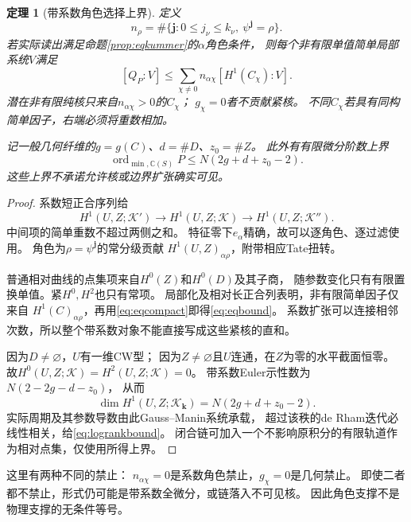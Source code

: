 \documentclass[11pt,a4paper]{ctexart}
\theoremstyle{cnplain}\newtheorem{theorem}{定理}[section]
\theoremstyle{definition}\newtheorem{definition}[theorem]{定义}
\theoremstyle{remark}\newtheorem{remark}[theorem]{注}
\begin{document}
\begin{theorem}[带系数角色选择上界]\label{thm:eqselection}
定义
\begin{equation}\label{eq:nchar}
 n_\rho=\#\{\mathbf j:0\le j_\nu\le k_\nu,\ \psi^{\mathbf j}=\rho\}.
\end{equation}
若实际读出满足命题\ref{prop:eqkummer}的$\alpha$角色条件，
则每个非有限单值简单局部系统$V$满足
\begin{equation}\label{eq:eqbound}
 [Q_P:V]\le\sum_{\chi\ne0}
                  n_{\alpha\chi}[H^1(C_\chi):V].
\end{equation}
潜在非有限纯核只来自$n_{\alpha\chi}>0$的$C_\chi$；
$g_\chi=0$者不贡献紧核。
不同$C_\chi$若具有同构简单因子，右端必须将重数相加。

记一般几何纤维的$g=g(C)$、$d=\#D$、$z_0=\#Z$。
此外有有限微分阶数上界
\begin{equation}\label{eq:logrankbound}
 \operatorname{ord}_{\min,\mathbb C(S)}P
             \le N(2g+d+z_0-2).
\end{equation}
这些上界不承诺允许核或边界扩张确实可见。
\end{theorem}
\begin{proof}
系数短正合序列给
\[
 H^1(U,Z;\mathcal K')\longrightarrow
 H^1(U,Z;\mathcal K)\longrightarrow H^1(U,Z;\mathcal K'').
\]
中间项的简单重数不超过两侧之和。
特征零下$e_\alpha$精确，故可以逐角色、逐过滤使用。
角色为$\rho=\psi^{\mathbf j}$的常分级贡献
$H^1(U,Z)_{\alpha\rho}$，附带相应Tate扭转。

普通相对曲线的点集项来自$H^0(Z)$和$H^0(D)$及其子商，
随参数变化只有有限置换单值。紧$H^0,H^2$也只有常项。
局部化及相对长正合列表明，非有限简单因子仅来自
$H^1(C)_{\alpha\rho}$，再用\eqref{eq:eqcompact}即得\eqref{eq:eqbound}。
系数扩张可以连接相邻次数，所以整个带系数对象不能直接写成这些紧核的直和。

因为$D\ne\varnothing$，$U$有一维CW型；
因为$Z\ne\varnothing$且$U$连通，在$Z$为零的水平截面恒零。
故$H^0(U,Z;\mathcal K)=H^2(U,Z;\mathcal K)=0$。
带系数Euler示性数为$N(2-2g-d-z_0)$，
从而
\[
 \dim H^1(U,Z;\mathcal K_{\mathbf k})=N(2g+d+z_0-2).
\]
实际周期及其参数导数由此Gauss--Manin系统承载，
超过该秩的de Rham迭代必线性相关，给\eqref{eq:logrankbound}。
闭合链可加入一个不影响原积分的有限轨道作为相对点集，仅使用所得上界。
\end{proof}

这里有两种不同的禁止：
$n_{\alpha\chi}=0$是系数角色禁止，$g_\chi=0$是几何禁止。
即使二者都不禁止，形式仍可能是带系数全微分，或链落入不可见核。
因此角色支撑不是物理支撑的无条件等号。
\end{document}
